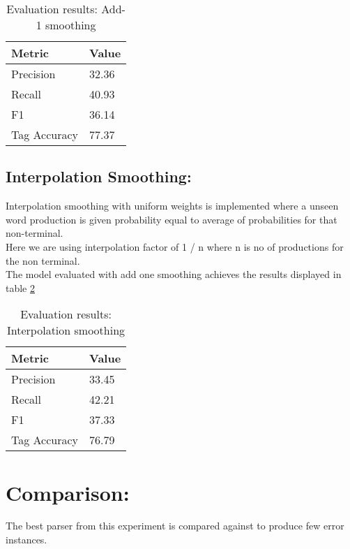 \documentclass[11pt,a4paper]{article}
\begin{document}
\begin{table}[h]
\centering
\begin{tabular}{|l|l|}
\hline
\textbf{Metric} & \textbf{Value} \\ \hline
Precision  & 32.36                          \\ \hline
Recall & 40.93                         \\ \hline
F1 & 36.14                         \\ \hline
Tag Accuracy & 77.37                         \\ \hline
\end{tabular}
\caption{Evaluation results: Add-1 smoothing}
\label{table1}
\end{table}

\subsection{Interpolation Smoothing:}
Interpolation smoothing with uniform weights is implemented where a unseen word production is given probability equal to average of probabilities for that non-terminal. \\
Here we are using interpolation factor of 1 / n where n is no of productions for the non terminal.\\
The model evaluated with add one smoothing achieves the results displayed in table \ref{table2}

\begin{table}[h]
\centering
\begin{tabular}{|l|l|}
\hline
\textbf{Metric} & \textbf{Value} \\ \hline
Precision  & 33.45                          \\ \hline
Recall & 42.21                         \\ \hline
F1 & 37.33                         \\ \hline
Tag Accuracy & 76.79                         \\ \hline

\end{tabular}
\caption{Evaluation results: Interpolation smoothing}
\label{table2}
\end{table}

\section{Comparison:}
The best parser from this experiment is compared against \cite{stanford} to produce few error instances.
\end{document}
